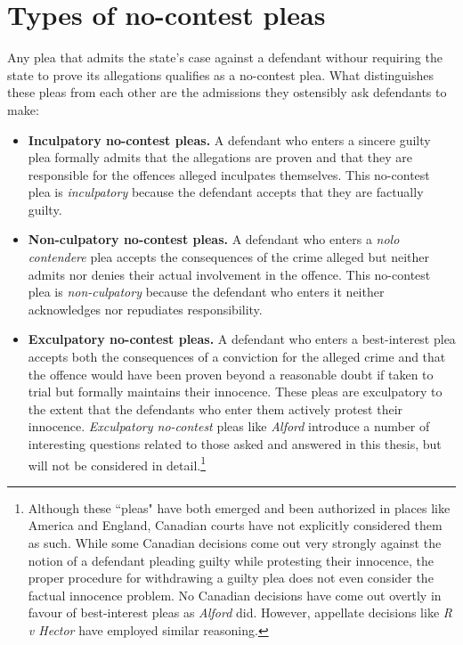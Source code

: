 \section{Types of no-contest pleas}

Any plea that admits the state's case against a defendant withour requiring the state to prove its allegations qualifies as a no-contest plea. What distinguishes these pleas from each other are the admissions they ostensibly ask defendants to make: 

\begin{itemize}

    \item \textbf{Inculpatory no-contest pleas.} A defendant who enters a sincere guilty plea formally admits that the allegations are proven and that they are responsible for the offences alleged inculpates themselves. This no-contest plea is \textit{inculpatory} because the defendant accepts that they are factually guilty.
    
    \item \textbf{Non-culpatory no-contest pleas.} A defendant who enters a \textit{nolo contendere} plea accepts the consequences of the crime alleged but neither admits nor denies their actual involvement in the offence. This no-contest plea is \textit{non-culpatory} because the defendant who enters it neither acknowledges nor repudiates responsibility.

    \item \textbf{Exculpatory no-contest pleas.} A defendant who enters a best-interest plea accepts both the consequences of a conviction for the alleged crime and that the offence would have been proven beyond a reasonable doubt if taken to trial but formally maintains their innocence. These pleas are exculpatory to the extent that the defendants who enter them actively protest their innocence. \textit{Exculpatory no-contest} pleas like \textit{Alford} introduce a number of interesting questions related to those asked and answered in this thesis, but will not be considered in detail.\footnote{Although these ``pleas" have both emerged and been authorized in places like America and England, Canadian courts have not explicitly considered them as such. While some Canadian decisions come out very strongly against the notion of a defendant pleading guilty while protesting their innocence, the proper procedure for withdrawing a guilty plea does not even consider the factual innocence problem. No Canadian decisions have come out overtly in favour of best-interest pleas as \textit{Alford} did. However, appellate decisions like \textit{R v Hector} have employed similar reasoning.} 
    
\end{itemize}

